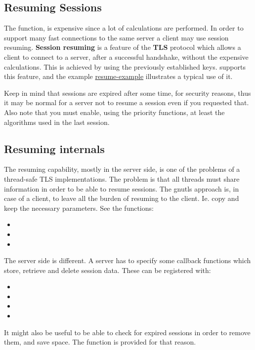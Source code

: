 \subsection{Resuming Sessions}
\label{resume}
\par
The 
 function, is expensive since a lot of calculations are performed. In order to support many fast connections to
the same server a client may use session resuming. {\bf Session resuming} is a
feature of the {\bf TLS} protocol which allows a client to connect to a server,
after a successful handshake, without the expensive calculations. This is
achieved by using the previously
established keys. \gnutls{} supports this feature, and the
example \hyperref{resume client}{resume client (see section }{)}{resume-example} illustrates a typical use of it.
\par
Keep in mind that sessions are expired after some time, for security reasons, thus
it may be normal for a server not to resume a session even if you requested that.
Also note that you must enable, using the priority functions, at least the
algorithms used in the last session.

\subsection{Resuming internals}
The resuming capability, mostly in the server side, is one of the problems of a thread-safe TLS
implementations. The problem is that all threads must share information in
order to be able to resume sessions. The gnutls approach is, in case of a
client, to leave all the burden of resuming to the client. Ie. copy and keep the
necessary parameters. See the functions:
\begin{itemize}
\item {}
\item {}
\item {}
\end{itemize}

\par
The server side is different. A server has to specify some callback functions
which store, retrieve and delete session data. These can be registered with:
\begin{itemize}
\item {}
\item {}
\item {}
\item {}
\end{itemize}

\par
It might also be useful to be able to check for expired sessions in order to remove 
them, and save space. The function
 is provided for that
reason.


